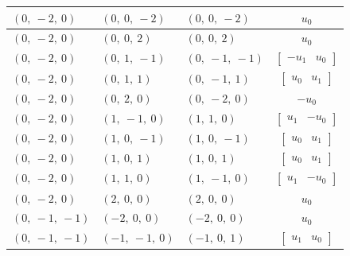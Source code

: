 \documentclass[11pt]{article}
\theoremstyle{definition}
\begin{document}
\begin{longtable}{|l|l|l|c|}
    \hline
    $\left( 0, \  -2, \  0\right)$ & $\left( 0, \  0, \  -2\right)$ & $\left( 0, \  0, \  -2\right)$ & $u_{0}$ \\
    \hline
    $\left( 0, \  -2, \  0\right)$ & $\left( 0, \  0, \  2\right)$ & $\left( 0, \  0, \  2\right)$ & $u_{0}$ \\
    \hline
    $\left( 0, \  -2, \  0\right)$ & $\left( 0, \  1, \  -1\right)$ & $\left( 0, \  -1, \  -1\right)$ & $\left[\begin{matrix}- u_{1} & u_{0}\end{matrix}\right]$ \\
    \hline
    $\left( 0, \  -2, \  0\right)$ & $\left( 0, \  1, \  1\right)$ & $\left( 0, \  -1, \  1\right)$ & $\left[\begin{matrix}u_{0} & u_{1}\end{matrix}\right]$ \\
    \hline
    $\left( 0, \  -2, \  0\right)$ & $\left( 0, \  2, \  0\right)$ & $\left( 0, \  -2, \  0\right)$ & $- u_{0}$ \\
    \hline
    $\left( 0, \  -2, \  0\right)$ & $\left( 1, \  -1, \  0\right)$ & $\left( 1, \  1, \  0\right)$ & $\left[\begin{matrix}u_{1} & - u_{0}\end{matrix}\right]$ \\
    \hline
    $\left( 0, \  -2, \  0\right)$ & $\left( 1, \  0, \  -1\right)$ & $\left( 1, \  0, \  -1\right)$ & $\left[\begin{matrix}u_{0} & u_{1}\end{matrix}\right]$ \\
    \hline
    $\left( 0, \  -2, \  0\right)$ & $\left( 1, \  0, \  1\right)$ & $\left( 1, \  0, \  1\right)$ & $\left[\begin{matrix}u_{0} & u_{1}\end{matrix}\right]$ \\
    \hline
    $\left( 0, \  -2, \  0\right)$ & $\left( 1, \  1, \  0\right)$ & $\left( 1, \  -1, \  0\right)$ & $\left[\begin{matrix}u_{1} & - u_{0}\end{matrix}\right]$ \\
    \hline
    $\left( 0, \  -2, \  0\right)$ & $\left( 2, \  0, \  0\right)$ & $\left( 2, \  0, \  0\right)$ & $u_{0}$ \\
    \hline
    $\left( 0, \  -1, \  -1\right)$ & $\left( -2, \  0, \  0\right)$ & $\left( -2, \  0, \  0\right)$ & $u_{0}$ \\
    \hline
    $\left( 0, \  -1, \  -1\right)$ & $\left( -1, \  -1, \  0\right)$ & $\left( -1, \  0, \  1\right)$ & $\left[\begin{matrix}u_{1} & u_{0}\end{matrix}\right]$ \\

\end{longtable}
\end{document}
